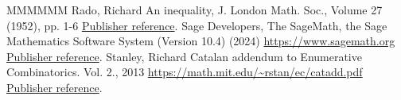 \documentclass[11pt]{article}
\theoremstyle{definition}
\numberwithin{equation}{section}
\begin{document}
\begin{thebibliography}{MMMMMM}
 Rado, Richard An inequality, J. London Math. Soc., Volume 27 (1952), pp. 1-6 \href{https://alco.centre-mersenne.org/articles/10.5802/alco.450/#Rado}{Publisher reference}.
 Sage Developers, The SageMath, the Sage Mathematics Software System (Version 10.4) (2024) \url{https://www.sagemath.org} \href{https://alco.centre-mersenne.org/articles/10.5802/alco.450/#sagemath}{Publisher reference}.
 Stanley, Richard Catalan addendum to Enumerative Combinatorics. Vol. 2., 2013 \url{https://math.mit.edu/~rstan/ec/catadd.pdf} \href{https://alco.centre-mersenne.org/articles/10.5802/alco.450/#EC2add}{Publisher reference}.
\end{thebibliography}
\end{document}
